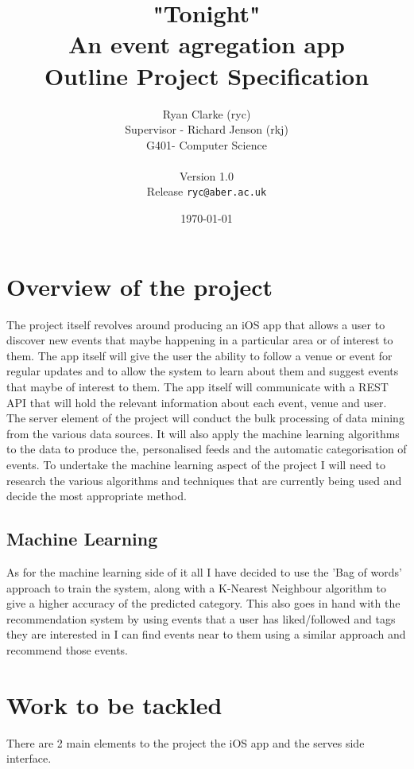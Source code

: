 \documentclass[11pt,fleqn,twoside]{article}
\begin{document}
	\linespread{1}
	\small \normalsize 
	\title{"Tonight" \\ 
	An event agregation app \\
	Outline Project Specification }
	\author{Ryan Clarke (ryc)\\
	  Supervisor - Richard Jenson (rkj)\\
	  G401- Computer Science\\
	\\ Version 1.0
	\\ Release
	  \texttt{ryc@aber.ac.uk}}
	\date{\today}
	\maketitle
	\pagebreak
	\setcounter{tocdepth}{4}
	\pagebreak
		
		\section{Overview of the project}
			The project itself revolves around producing an iOS app that allows a user to discover new events that maybe happening in a particular area or of interest to them. The app itself will give the user the ability to follow a venue or event for regular updates and to allow the system to learn about them and suggest events that maybe of interest to them. The app itself will communicate with a REST API that will hold the relevant information about each event, venue and user. The server element of the project will conduct the bulk processing of data mining from the various data sources. It will also apply the machine learning algorithms to the data to produce the, personalised feeds and the automatic categorisation of events. To undertake the machine learning aspect of the project I will need to research the various algorithms and techniques that are currently being used and decide the most appropriate method. 
			\subsection{Machine Learning}
			As for the machine learning side of it all I have decided to use the 'Bag of words' approach to train the system, along with a K-Nearest Neighbour algorithm to give a higher accuracy of the predicted category. This also goes in hand with the recommendation system by using events that a user has liked/followed and tags they are interested in I can find events near to them using a similar approach and recommend those events. 
		\section{Work to be tackled}
			There are 2 main elements to the project the iOS app and the serves side interface. 
\end{document}
